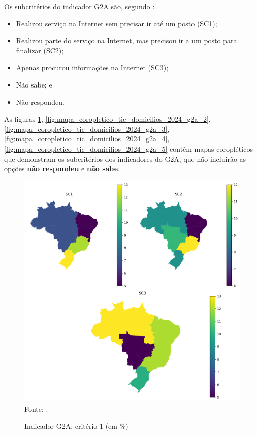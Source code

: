 Os subcritérios do indicador G2A são, segundo \cite{tic_domicilios_2024_g2a}:

\begin{itemize}
    \item Realizou serviço na Internet sem precisar ir até um posto (SC1);  \item Realizou parte do serviço na Internet, mas precisou ir a um posto para finalizar (SC2);
    \item Apenas procurou informações na Internet (SC3);
    \item Não sabe; e
    \item Não respondeu.
\end{itemize}

As figuras \ref{fig:mapa_coropletico_tic_domicilios_2024_g2a_1}, \ref{fig:mapa_coropletico_tic_domicilios_2024_g2a_2}, \ref{fig:mapa_coropletico_tic_domicilios_2024_g2a_3},
\ref{fig:mapa_coropletico_tic_domicilios_2024_g2a_4},
\ref{fig:mapa_coropletico_tic_domicilios_2024_g2a_5} contêm mapas coropléticos que demonstram os subcritérios dos indicadores do G2A, que não incluirão as opções \textbf{não respondeu} e \textbf{não sabe}.

\begin{figure}[H]
	\centering
	\caption{Indicador G2A: critério 1 (em \%)}
	\includegraphics[width=1\linewidth]{figuras/mapa_coropletico_tic_domicilios_2024_g2a_1.png}
	\label{fig:mapa_coropletico_tic_domicilios_2024_g2a_1}
	\footnotesize{Fonte: \cite{tic_domicilios_2024_g2a}.}
\end{figure}

